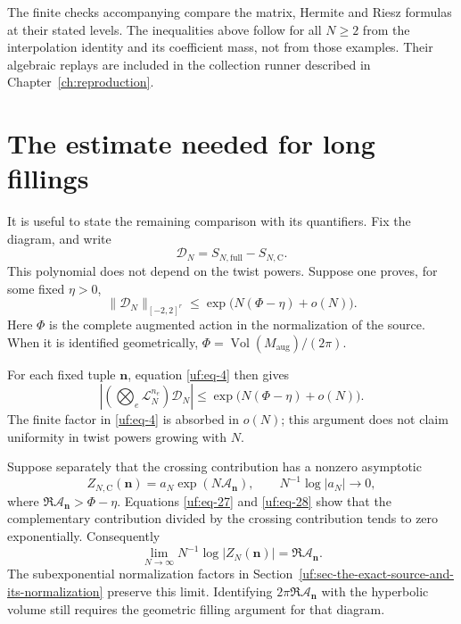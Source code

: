 The finite checks accompanying \cite{Finite} compare the matrix,
Hermite and Riesz formulas at their stated levels. The inequalities
above follow for all $N\ge2$ from the interpolation identity and its
coefficient mass, not from those examples. Their algebraic replays
are included in the collection runner described in
Chapter~\ref{ch:reproduction}.

\section{The estimate needed for long
fillings}\label{uf:sec-the-estimate-needed-for-long-fillings}

It is useful to state the remaining comparison with its quantifiers. Fix
the diagram, and write \[
 \mathcal D_N=S_{N,\mathrm{full}}-S_{N,\mathrm C}.
\] This polynomial does not depend on the twist powers. Suppose one
proves, for some fixed \(\eta>0\), \begin{equation}\label{uf:eq-26}
\|\mathcal D_N\|_{[-2,2]^r}
       \le \exp\bigl(N(\Phi-\eta)+o(N)\bigr).
\end{equation} Here \(\Phi\) is the complete augmented action in the normalization
of the source. When it is identified geometrically,
\(\Phi=\operatorname{Vol}(M_{\mathrm{aug}})/(2\pi)\).

For each fixed tuple \(\boldsymbol n\), equation \eqref{uf:eq-4} then gives \begin{equation}\label{uf:eq-27}
\left|\left(\bigotimes_e\mathcal L_N^{n_e}\right)\mathcal D_N\right|
       \le \exp\bigl(N(\Phi-\eta)+o(N)\bigr).
\end{equation} The finite factor in \eqref{uf:eq-4} is absorbed in \(o(N)\); this argument does
not claim uniformity in twist powers growing with \(N\).

Suppose separately that the crossing contribution has a nonzero
asymptotic \begin{equation}\label{uf:eq-28}
Z_{N,\mathrm C}(\boldsymbol n)
       =a_N\exp(N\mathcal A_{\boldsymbol n}),\qquad
       N^{-1}\log|a_N|\longrightarrow0,
\end{equation} where \(\Re\mathcal A_{\boldsymbol n}>\Phi-\eta\). Equations \eqref{uf:eq-27} and
\eqref{uf:eq-28} show that the complementary contribution divided by the crossing
contribution tends to zero exponentially. Consequently \begin{equation}\label{uf:eq-29}
\lim_{N\to\infty}N^{-1}\log|Z_N(\boldsymbol n)|
       =\Re\mathcal A_{\boldsymbol n}.
\end{equation} The subexponential normalization factors in
Section~\ref{uf:sec-the-exact-source-and-its-normalization} preserve this
limit. Identifying \(2\pi\Re\mathcal A_{\boldsymbol n}\) with the
hyperbolic volume still requires the geometric filling argument for that
diagram.


